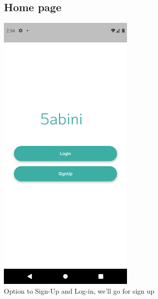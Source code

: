 \documentclass[12pt]{article}
\begin{document}
\begin{figure}[h!]
\vspace{-2cm}

\subsection*{Home page}
\centerline{\includegraphics[width=0.6\textwidth]{./Screenshots/1.PNG}}
  \caption{Option to Sign-Up and Log-in, we'll go for sign up}
\end{figure}
\end{document}
